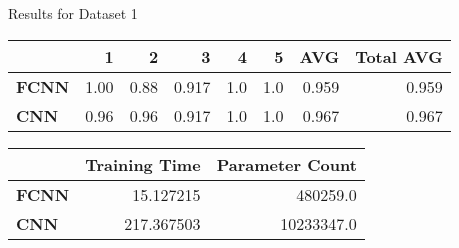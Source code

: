 Results for Dataset 1 
\\ \hfill \break\begin{tabular}{lrrrrrrr}
\toprule
{} &     1 &     2 &      3 &    4 &    5 &    AVG &  Total AVG \\
\midrule
\textbf{FCNN} &  1.00 &  0.88 &  0.917 &  1.0 &  1.0 &  0.959 &      0.959 \\
\textbf{CNN } &  0.96 &  0.96 &  0.917 &  1.0 &  1.0 &  0.967 &      0.967 \\
\bottomrule
\end{tabular}

\hfill \break\hfill \break
\begin{tabular}{lrr}
\toprule
{} &  Training Time &  Parameter Count \\
\midrule
\textbf{FCNN} &      15.127215 &         480259.0 \\
\textbf{CNN } &     217.367503 &       10233347.0 \\
\bottomrule
\end{tabular}

\hfill \break\hfill \break
